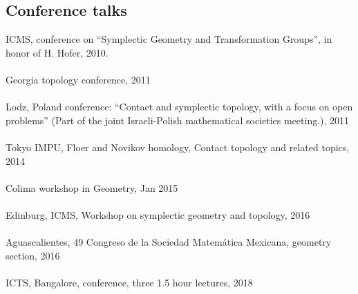 \documentclass[overlapped,line,letterpaper]{res}
\begin{document}
\begin{resume}
\section {\sc Conference talks}
ICMS, conference on ``Symplectic Geometry and Transformation Groups'', in honor
of H. Hofer, 2010. \\\\
Georgia topology conference, 2011 \\\\
Lodz, Poland conference: ``Contact and symplectic topology, with a focus on open
problems'' (Part of the joint Israeli-Polish mathematical societies meeting.), 2011 \\\\
Tokyo IMPU, Floer and Novikov homology, Contact topology and related topics, 2014 \\\\
% 
Colima workshop in Geometry, Jan 2015  \\\\
Edinburg, ICMS, Workshop on symplectic geometry and topology, 2016 \\\\
Aguascalientes, 49 Congreso de la Sociedad Matemática Mexicana, geometry section, 2016 \\\\
ICTS, Bangalore, conference, three 1.5 hour lectures, 2018 \\\\

\end{resume}
\end{document}
